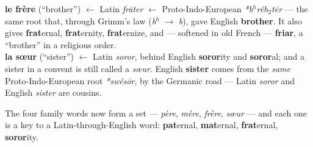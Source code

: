 \begin{cousinweb}
\textbf{le fr\`{e}re} (``brother'') $\leftarrow$ Latin \emph{fr\=ater}
$\leftarrow$ Proto-Indo-European \emph{*b$^h$r\'{e}h$_2$t\=er} --- the same
root that, through Grimm's law (\emph{b$^h$} $\to$ \emph{b}), gave English
\textbf{brother}. It also gives \textbf{frat}ernal, \textbf{frat}ernity,
\textbf{frat}ernize, and --- softened in old French --- \textbf{friar}, a
``brother'' in a religious order.\\[3pt]
\textbf{la s\oe{}ur} (``sister'') $\leftarrow$ Latin \emph{soror}, behind
English \textbf{soror}ity and \textbf{soror}al; and a sister in a convent is
still called a \emph{s\oe{}ur}. English \textbf{sister} comes from the
\emph{same} Proto-Indo-European root \emph{*sw\'{e}s\=or}, by the Germanic
road --- Latin \emph{soror} and English \emph{sister} are cousins.
\end{cousinweb}

The four family words now form a set --- \emph{p\`{e}re}, \emph{m\`{e}re},
\emph{fr\`{e}re}, \emph{s\oe{}ur} --- and each one is a key to a
Latin-through-English word: \textbf{pat}ernal, \textbf{mat}ernal,
\textbf{frat}ernal, \textbf{soror}ity.
